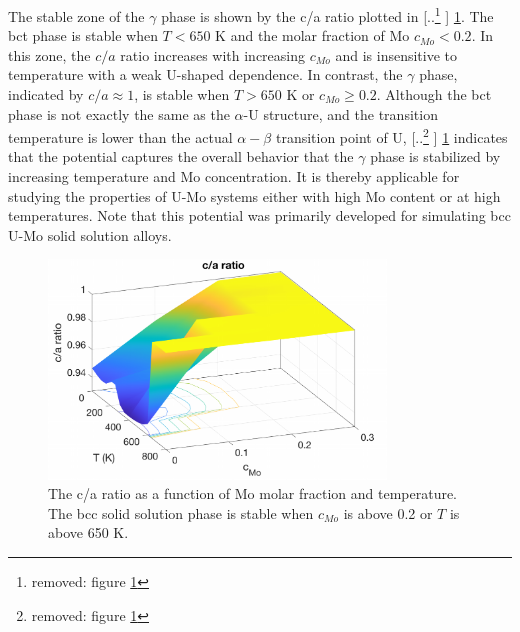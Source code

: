 \documentclass[review]{elsarticle}
\providecommand{\DIFaddtex}[1]{{\protect\color{blue} \sf #1}} %
\providecommand{\DIFdeltex}[1]{{\protect\color{red} [..\footnote{removed: #1} ]}} %
\providecommand{\DIFaddbegin}{} %
\providecommand{\DIFaddend}{} %
\providecommand{\DIFdelbegin}{} %
\providecommand{\DIFdelend}{} %
\providecommand{\DIFaddFL}[1]{\DIFadd{#1}} %
\providecommand{\DIFaddbeginFL}{} %
\providecommand{\DIFaddendFL}{} %
\providecommand{\DIFdelbeginFL}{} %
\providecommand{\DIFdelendFL}{} %
\providecommand{\DIFadd}[1]{\texorpdfstring{\DIFaddtex{#1}}{#1}} %
\providecommand{\DIFdel}[1]{\texorpdfstring{\DIFdeltex{#1}}{}} %
\newcommand{\DIFscaledelfig}{0.5}
\newlength{\DIFdelgraphicswidth} %
\newlength{\DIFdelgraphicsheight} %
\newcommand{\DIFaddincludegraphics}[2][]{{\color{blue}\fbox{\DIFOincludegraphics[#1]{#2}}}} %
\newcommand{\DIFdelincludegraphics}[2][]{%
\sbox{\DIFdelgraphicsbox}{\DIFOincludegraphics[#1]{#2}}%
\settoboxwidth{\DIFdelgraphicswidth}{\DIFdelgraphicsbox} %
\settoboxtotalheight{\DIFdelgraphicsheight}{\DIFdelgraphicsbox} %
\scalebox{\DIFscaledelfig}{%
\parbox[b]{\DIFdelgraphicswidth}{\usebox{\DIFdelgraphicsbox}\\[-\baselineskip] \rule{\DIFdelgraphicswidth}{0em}}\llap{\resizebox{\DIFdelgraphicswidth}{\DIFdelgraphicsheight}{%
\setlength{\unitlength}{\DIFdelgraphicswidth}%
\begin{picture}(1,1)%
\thicklines\linethickness{2pt} %
{\color[rgb]{1,0,0}\put(0,0){\framebox(1,1){}}}%
{\color[rgb]{1,0,0}\put(0,0){\line( 1,1){1}}}%
{\color[rgb]{1,0,0}\put(0,1){\line(1,-1){1}}}%
\end{picture}%
}\hspace*{3pt}}} %
} %
\DeclareRobustCommand{\DIFaddbegin}{\DIFOaddbegin \let\includegraphics\DIFaddincludegraphics} %
\DeclareRobustCommand{\DIFaddend}{\DIFOaddend \let\includegraphics\DIFOincludegraphics} %
\DeclareRobustCommand{\DIFdelbegin}{\DIFOdelbegin \let\includegraphics\DIFdelincludegraphics} %
\DeclareRobustCommand{\DIFdelend}{\DIFOaddend \let\includegraphics\DIFOincludegraphics} %
\DeclareRobustCommand{\DIFaddbeginFL}{\DIFOaddbeginFL \let\includegraphics\DIFaddincludegraphics} %
\DeclareRobustCommand{\DIFaddendFL}{\DIFOaddendFL \let\includegraphics\DIFOincludegraphics} %
\DeclareRobustCommand{\DIFdelbeginFL}{\DIFOdelbeginFL \let\includegraphics\DIFdelincludegraphics} %
\DeclareRobustCommand{\DIFdelendFL}{\DIFOaddendFL \let\includegraphics\DIFOincludegraphics} %
\begin{document}
The stable zone of the $\gamma$ phase is shown by the c/a ratio plotted in \DIFdelbegin \DIFdel{figure \ref{fig:c_a_ratio}}\DIFdelend \DIFaddbegin \DIFadd{\cref{fig:c_a_ratio}}\DIFaddend . The bct phase is stable when $T<650$ K and the molar fraction of Mo $c_{Mo}<0.2$. In this zone, the $c/a$ ratio increases with increasing $c_{Mo}$ and is insensitive to temperature with a weak U-shaped dependence. In contrast, the $\gamma$ phase, indicated by $c/a\approx1$, is stable when $T>650$ K or $c_{Mo}\geq0.2$. Although the bct phase is not exactly the same as the $\alpha$-U structure, and the transition temperature is lower than the actual $\alpha-\beta$ transition point of U, \DIFdelbegin \DIFdel{figure \ref{fig:c_a_ratio} }\DIFdelend \DIFaddbegin \DIFadd{\cref{fig:c_a_ratio} }\DIFaddend indicates that the potential captures the overall behavior that the $\gamma$ phase is stabilized by increasing temperature and Mo concentration. It is thereby applicable for studying the properties of U-Mo systems either with high Mo content or at high temperatures. \DIFaddbegin \DIFadd{Note that this potential was primarily developed for simulating bcc U-Mo solid solution alloys.
}\DIFaddend 

\DIFaddbegin 

\DIFaddend \begin{figure}[h!]
 \centering
 \DIFdelbeginFL %
\DIFdelendFL \DIFaddbeginFL \includegraphics[width=0.8\textwidth]{c_a} 
 \DIFaddendFL \caption{The c/a ratio as a function of Mo molar fraction and temperature. \DIFaddbeginFL \DIFaddFL{The bcc solid solution phase is stable when $c_{Mo}$ is above 0.2 or $T$ is above 650 K. }\DIFaddendFL }
 \label{fig:c_a_ratio}
\end{figure}
\end{document}
